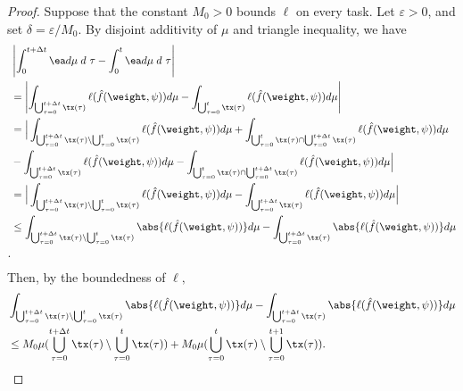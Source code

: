 \begin{proof}
    Suppose that the constant $M_0>0$ bounds $\ell$ on every task. 
    Let $\varepsilon>0$, and  set $\delta = \varepsilon/M_0.$  By disjoint additivity of $\mu$ and triangle inequality, we have
    \begin{align*}
       & \left\vert   
       \int_0^{t+\Delta t} \ea d\mu\; d~\tau- 
       \int_0^t \ea d\mu\; d~\tau\right\vert \\
        & = \left\vert \displaystyle\int_{\bigcup_{\tau = 0}^{t+\Delta t} \tx(\tau)} \ell(\hat{f}(\weight,\psi))d\mu- \displaystyle\int_{\bigcup_{\tau = 0}^{t} \tx(\tau)} \ell(\hat{f}(\weight,\psi))d\mu\right\vert \\
        & = \Big\vert \displaystyle\int_{\bigcup_{\tau = 0}^{t+\Delta t} \tx(\tau)\setminus \bigcup_{\tau = 0}^{t} \tx(\tau)} \ell(\hat{f}(\weight,\psi))d\mu+ \displaystyle\int_{\bigcup_{\tau = 0}^{t} \tx(\tau)\cap\bigcup_{\tau = 0}^{t+\Delta t} \tx(\tau)} \ell(\hat{f}(\weight,\psi))d\mu\\
        & -\displaystyle\int_{\bigcup_{\tau = 0}^{t+\Delta t} \tx(\tau)} \ell(\hat{f}(\weight,\psi))d\mu- \displaystyle\int_{\bigcup_{\tau = 0}^{t} \tx(\tau)\cap \bigcup_{\tau = 0}^{t+\Delta t} \tx(\tau)} \ell(\hat{f}(\weight,\psi))d\mu\Big\vert\\
        & = \Big\vert \displaystyle\int_{\bigcup_{\tau = 0}^{t+\Delta t} \tx(\tau)\setminus \bigcup_{\tau = 0}^{t} \tx(\tau)} \ell(\hat{f}(\weight,\psi))d\mu-\displaystyle\int_{\bigcup_{\tau = 0}^{t+\Delta t} \tx(\tau)} \ell(\hat{f}(\weight,\psi))d\mu\Big\vert\\
        & \leq \displaystyle\int_{\bigcup_{\tau = 0}^{t+\Delta t} \tx(\tau)\setminus \bigcup_{\tau = 0}^{t} \tx(\tau)} \abs{\ell(\hat{f}(\weight,\psi))}d\mu-\displaystyle\int_{\bigcup_{\tau = 0}^{t+\Delta t} \tx(\tau)} \abs{\ell(\hat{f}(\weight,\psi))}d\mu \\.
    \end{align*}
    Then, by the boundedness of $\ell,$
    \begin{align*}
        &\displaystyle\int_{\bigcup_{\tau = 0}^{t+\Delta t} \tx(\tau)\setminus \bigcup_{\tau = 0}^{t} \tx(\tau)} \abs{\ell(\hat{f}(\weight,\psi))}d\mu-\displaystyle\int_{\bigcup_{\tau = 0}^{t+\Delta t} \tx(\tau)} \abs{\ell(\hat{f}(\weight,\psi))}d\mu \\
        & \leq M_0 \mu(\bigcup_{\tau = 0}^{t+\Delta t} \tx(\tau)\setminus \bigcup_{\tau = 0}^{t} \tx(\tau)) + M_0\mu(\bigcup_{\tau = 0}^{t} \tx(\tau)\setminus \bigcup_{\tau = 0}^{t+1} \tx(\tau)).
    \end{align*}

\end{proof}
